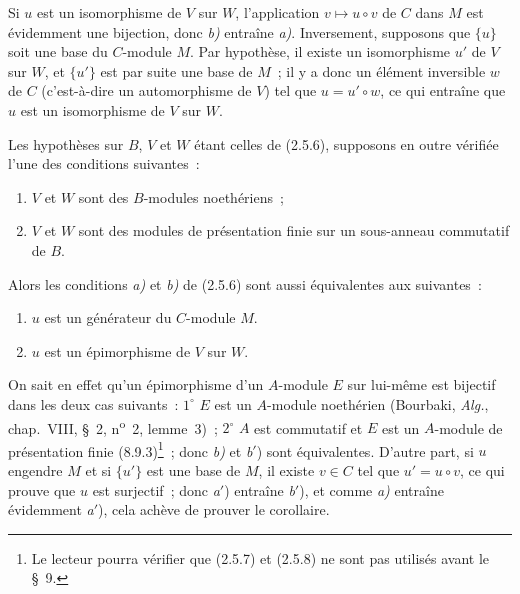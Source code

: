Si $u$ est un isomorphisme de $V$ sur $W$, l'application
$v\mapsto u\circ v$ de $C$ dans $M$ est évidemment une bijection, donc
\emph{b)} entraîne \emph{a)}. Inversement, supposons que $\{u\}$ soit une
base du $C$-module $M$. Par hypothèse, il existe un isomorphisme $u'$ de $V$
sur $W$, et $\{u'\}$ est par suite une base de $M$~; il y a donc un élément
inversible $w$ de $C$ (c'est-à-dire un automorphisme de $V$) tel que
$u=u'\circ w$, ce qui entraîne que $u$ est un isomorphisme de $V$ sur $W$.

\begin{corollary}[2.5.7]
\label{IV.2.5.7-fr}
Les hypothèses sur $B$, $V$ et $W$ étant celles de (2.5.6), supposons en
outre vérifiée l'une des conditions suivantes~:
\begin{enumerate}
\item[(i)] $V$ et $W$ sont des $B$-modules noethériens~;
\item[(ii)] $V$ et $W$ sont des modules de présentation finie sur un
sous-anneau commutatif de $B$.
\end{enumerate}
Alors les conditions \emph{a)} et \emph{b)} de (2.5.6) sont aussi
équivalentes aux suivantes~:
\begin{enumerate}
\item[\emph{a}$'$)] $u$ est un générateur du $C$-module $M$.
\item[\emph{b}$'$)] $u$ est un épimorphisme de $V$ sur $W$.
\end{enumerate}
\end{corollary}

On sait en effet qu'un épimorphisme d'un $A$-module $E$ sur lui-même est
bijectif dans les deux cas suivants~: $1^\circ$ $E$ est un $A$-module
noethérien (Bourbaki, \emph{Alg.}, chap.~VIII, \S~2,
n\textsuperscript{o}~2, lemme~3)~; $2^\circ$ $A$ est commutatif et $E$ est
un $A$-module de présentation finie (8.9.3)\footnote{Le lecteur pourra
vérifier que (2.5.7) et (2.5.8) ne sont pas utilisés avant le \S~9.}~; donc
\emph{b)} et \emph{b}$'$) sont équivalentes. D'autre part, si $u$ engendre
$M$
et si $\{u'\}$ est une base de $M$, il existe $v\in C$ tel que
$u'=u\circ v$, ce qui prouve que $u$ est surjectif~; donc \emph{a}$'$)
entraîne \emph{b}$'$), et comme \emph{a)} entraîne évidemment
\emph{a}$'$), cela achève de prouver le corollaire.

